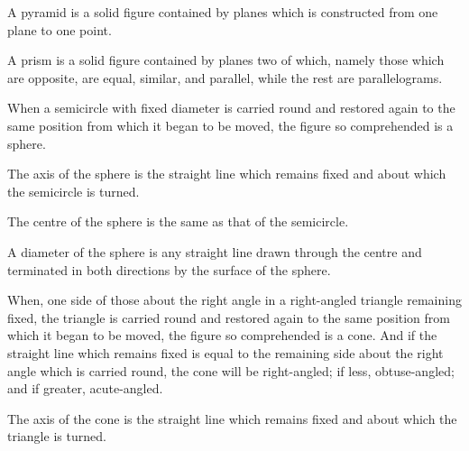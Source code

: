\begin{scope}
\label{def:XI.12}
A pyramid is a solid figure contained by planes which is constructed
from one plane to one point.
\end{scope}

\begin{scope}
\label{def:XI.13}
A prism is a solid figure contained by planes two of which, namely
those which are opposite, are equal, similar, and parallel, while the
rest are parallelograms.
\end{scope}

\begin{scope}
\label{def:XI.14}
When a semicircle with fixed diameter is carried round and restored
again to the same position from which it began to be moved, the
figure so comprehended is a sphere.
\end{scope}

\begin{scope}
\label{def:XI.15}
The axis of the sphere is the straight line which remains fixed and
about which the semicircle is turned.
\end{scope}

\begin{scope}
\label{def:XI.16}
The centre of the sphere is the same as that of the semicircle.
\end{scope}

\begin{scope}
\label{def:XI.17}
A diameter of the sphere is any straight line drawn through the
centre and terminated in both directions by the surface of the sphere.
\end{scope}

\begin{scope}
\label{def:XI.18}
When, one side of those about the right angle in a right-angled
triangle remaining fixed, the triangle is carried round and restored
again to the same position from which it began to be moved, the
figure so comprehended is a cone.  And if the straight line which
remains fixed is equal to the remaining side about the right angle
which is carried round, the cone will be right-angled; if less,
obtuse-angled; and if greater, acute-angled.
\end{scope}

\begin{scope}
\label{def:XI.19}
The axis of the cone is the straight line which remains fixed and
about which the triangle is turned.
\end{scope}

